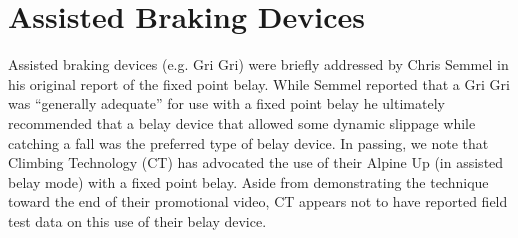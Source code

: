 \documentclass[nonacm,acmtog]{acmart}
\begin{document}
\section{Assisted Braking Devices}
Assisted braking devices (e.g. Gri Gri) were briefly addressed by Chris Semmel
in his original report of the fixed point belay. While Semmel reported that a
Gri Gri was “generally adequate” for use with a fixed point belay he ultimately
recommended that a belay device that allowed some dynamic slippage while
catching a fall was the preferred type of belay device. In passing, we note
that Climbing Technology (CT) has advocated the use of their Alpine Up (in
assisted belay mode) with a fixed point belay. Aside from demonstrating the
technique toward the end of their promotional video, CT appears not to have
reported field test data on this use of their belay device.
\end{document}
